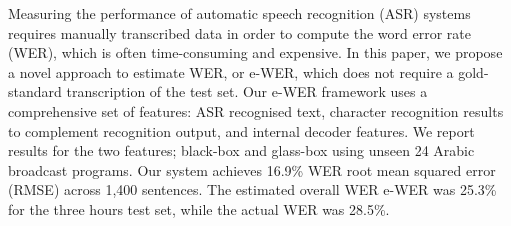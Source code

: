 Measuring the performance of automatic speech recognition (ASR) systems requires manually transcribed data in order to compute the word error rate (WER), which is often time-consuming and expensive. In this paper, we propose a novel approach to estimate WER, or e-WER, which does not require a gold-standard transcription of the test set. Our e-WER framework uses a comprehensive set of features: ASR recognised text, character recognition results to complement recognition output, and internal decoder features. We report results for the two features; black-box and glass-box using unseen 24 Arabic broadcast programs. Our system achieves 16.9\% WER root mean squared error (RMSE) across 1,400 sentences. The estimated overall WER e-WER was 25.3\% for the three hours test set, while the actual WER was 28.5\%.
